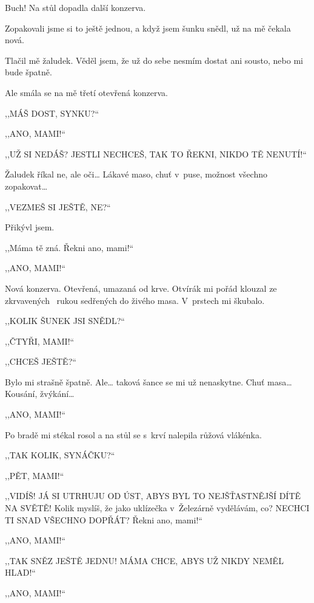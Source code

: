 Buch! Na stůl dopadla další konzerva.

Zopakovali jsme si to ještě jednou, a když jsem šunku snědl, už na mě čekala nová. 

Tlačil mě žaludek. Věděl jsem, že už do sebe nesmím dostat ani sousto, nebo mi bude špatně.

Ale smála se na mě třetí otevřená konzerva.

,,MÁŠ DOST, SYNKU?``

,,ANO, MAMI!``

,,UŽ SI NEDÁŠ? JESTLI NECHCEŠ, TAK TO ŘEKNI, NIKDO TĚ NENUTÍ!``

Žaludek říkal ne, ale oči… Lákavé maso, chuť v puse, možnost všechno zopakovat…

,,VEZMEŠ SI JEŠTĚ, NE?``

Přikývl jsem. 

,,Máma tě zná. Řekni ano, mami!``

,,ANO, MAMI!``

Nová konzerva. Otevřená, umazaná od krve. Otvírák mi pořád klouzal ze zkrvavených  rukou sedřených do živého masa. V prstech mi škubalo. 

,,KOLIK ŠUNEK JSI SNĚDL?``

,,ČTYŘI, MAMI!``

,,CHCEŠ JEŠTĚ?``

Bylo mi strašně špatně. Ale… taková šance se mi už nenaskytne. Chuť masa… Kousání, žvýkání…

,,ANO, MAMI!``

Po bradě mi stékal rosol a na stůl se s krví nalepila růžová vlákénka.

,,TAK KOLIK, SYNÁČKU?``

,,PĚT, MAMI!``

,,VIDÍŠ! JÁ SI UTRHUJU OD ÚST, ABYS BYL TO NEJŠŤASTNĚJŠÍ DÍTĚ NA SVĚTĚ! Kolik myslíš, že jako uklízečka v Železárně vydělávám, co? NECHCI TI SNAD VŠECHNO DOPŘÁT? Řekni ano, mami!`` 

,,ANO, MAMI!``

,,TAK SNĚZ JEŠTĚ JEDNU! MÁMA CHCE, ABYS UŽ NIKDY NEMĚL HLAD!``

,,ANO, MAMI!``

